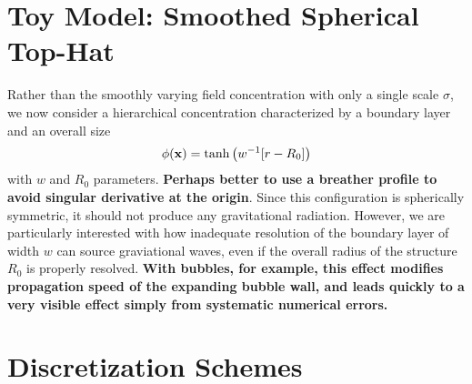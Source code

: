 \documentclass{revtex4}
\begin{document}
\section{Toy Model: Smoothed Spherical Top-Hat}
Rather than the smoothly varying field concentration with only a single scale $\sigma$, we now consider a hierarchical concentration characterized by a boundary layer and an overall size
\begin{equation}
  \phi({\bf x}) = \tanh\left(w^{-1}[r-R_0]\right)
\end{equation}
with $w$ and $R_0$ parameters.
{\bf Perhaps better to use a breather profile to avoid singular derivative at the origin}.
Since this configuration is spherically symmetric, it should not produce any gravitational radiation.
However, we are particularly interested with how inadequate resolution of the boundary layer of width $w$ can source graviational waves, even if the overall radius of the structure $R_0$ is properly resolved.
{\bf With bubbles, for example, this effect modifies propagation speed of the expanding bubble wall, and leads quickly to a very visible effect simply from systematic numerical errors.}



\section{Discretization Schemes}
\end{document}
